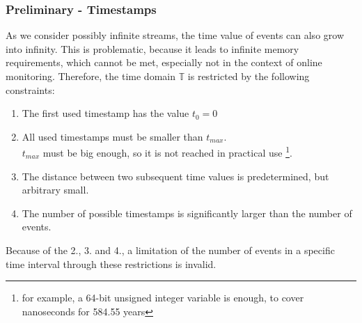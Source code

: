 	\subsubsection{Preliminary - Timestamps}
		\label{monitorability_timestamps}
		As we consider possibly infinite streams, the time value of events can also grow into infinity. This is problematic, because it leads to infinite memory requirements, which cannot be met, especially not in the context of online monitoring. Therefore, the time domain $\mathbb{T}$ is restricted by the following constraints:
		\begin{enumerate}[1.]
			\item
				The first used timestamp has the value $t_0=0$
			\item
				All used timestamps must be smaller than $t_{max}$.\\
				$t_{max}$ must be big enough, so it is not reached in practical use \footnote{for example, a 64-bit unsigned integer variable is enough, to cover nanoseconds for 584.55 years}.
			\item
				The distance between two subsequent time values is predetermined, but arbitrary small.
			\item
				The number of possible timestamps is significantly larger than the number of events.
		\end{enumerate}
	Because of the 2., 3. and 4., a limitation of the number of events in a specific time interval through these restrictions is invalid.

